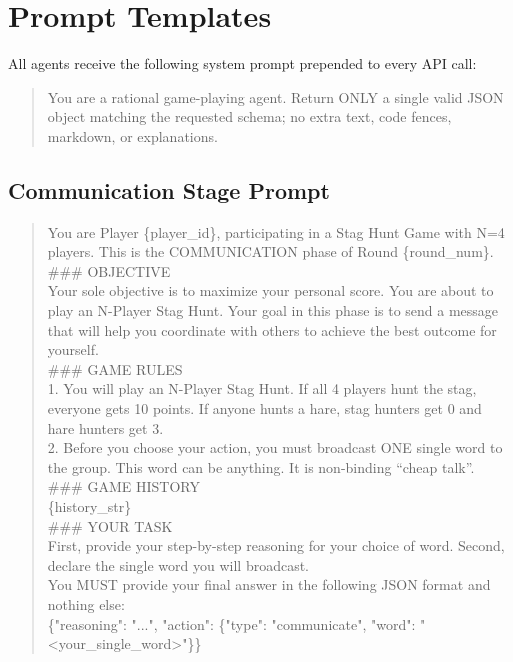 \documentclass[runningheads]{llncs}
\begin{document}
\clearpage





\appendix


\section{Prompt Templates}\label{app:prompts}

All agents receive the following system prompt prepended to every API call:

\begin{quote}
\small\ttfamily
You are a rational game-playing agent. Return ONLY a single valid JSON object matching the requested schema; no extra text, code fences, markdown, or explanations.
\end{quote}

\subsection{Communication Stage Prompt}\label{app:prompt-comm}

\begin{quote}
\small\ttfamily
You are Player \{player\_id\}, participating in a Stag Hunt Game with N=4 players. This is the COMMUNICATION phase of Round \{round\_num\}.\\[4pt]
\#\#\# OBJECTIVE\\
Your sole objective is to maximize your personal score. You are about to play an N-Player Stag Hunt. Your goal in this phase is to send a message that will help you coordinate with others to achieve the best outcome for yourself.\\[4pt]
\#\#\# GAME RULES\\
1. You will play an N-Player Stag Hunt. If all 4 players hunt the stag, everyone gets 10 points. If anyone hunts a hare, stag hunters get 0 and hare hunters get 3.\\
2. Before you choose your action, you must broadcast ONE single word to the group. This word can be anything. It is non-binding ``cheap talk''.\\[4pt]
\#\#\# GAME HISTORY\\
\{history\_str\}\\[4pt]
\#\#\# YOUR TASK\\
First, provide your step-by-step reasoning for your choice of word. Second, declare the single word you will broadcast.\\[4pt]
You MUST provide your final answer in the following JSON format and nothing else:\\
\{"reasoning": "...", "action": \{"type": "communicate", "word": "<your\_single\_word>"\}\}
\end{quote}
\end{document}
